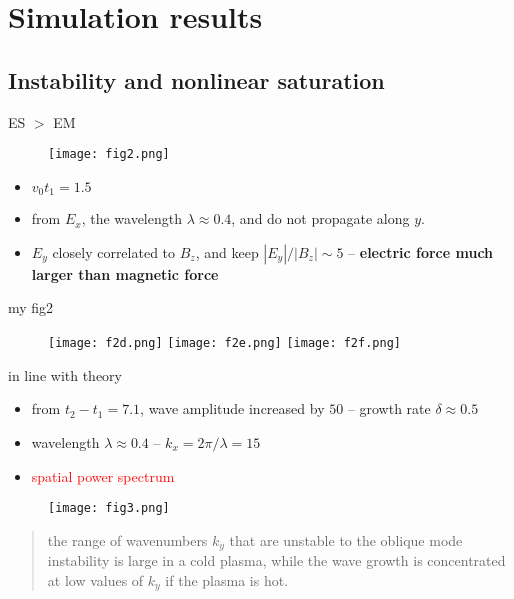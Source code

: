 \documentclass[10pt]{beamer}
\begin{document}
\section{Simulation results}

\subsection{Instability and nonlinear saturation}

\begin{frame}{ES $>$ EM}

\begin{figure}
  \texttt{[image: fig2.png]}
\end{figure}
\begin{center}
\begin{itemize}
\item $v_0t_1=1.5$
\item from $E_x$, the wavelength $\lambda \approx 0.4$, and do not propagate along $y$.
\item $E_y$ closely correlated to $B_z$, and keep $|E_y|/|B_z| \sim 5$ -- \textbf{electric force much larger than magnetic force}
\end{itemize}
\end{center}
\end{frame}

\begin{frame}{my fig2}

\begin{figure}
  \texttt{[image: f2d.png]}
  \texttt{[image: f2e.png]}
  \texttt{[image: f2f.png]}
\end{figure}

\end{frame}


\begin{frame}{in line with theory}
  \begin{itemize}
  \item from $t_2-t_1=7.1$, wave amplitude increased by $50$ -- growth rate $\delta \approx 0.5$
  \item wavelength $\lambda \approx 0.4$ -- $k_x = 2\pi/\lambda = 15$
  \item \textcolor{red}{spatial power spectrum}
  \end{itemize}
  
  \begin{figure}
  	\texttt{[image: fig3.png]}
  \end{figure}
  
  \begin{quote}
    the range of wavenumbers $k_y$ that are unstable to the oblique mode instability is large in a cold plasma, while the wave growth is concentrated at low values of $k_y$ if the plasma is hot.
  \end{quote}
\end{frame}
\end{document}
